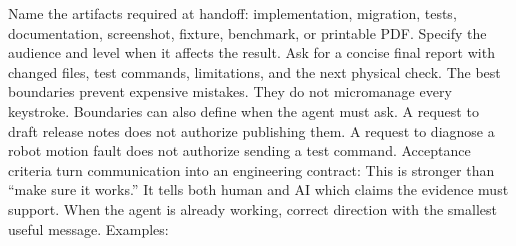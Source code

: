 {}
\markdownRendererSectionEnd \markdownRendererSectionBegin
{}\markdownRendererInterblockSeparator
{}Name the artifacts required at handoff: implementation, migration, tests,\markdownRendererSoftLineBreak
{}documentation, screenshot, fixture, benchmark, or printable PDF. Specify the\markdownRendererSoftLineBreak
{}audience and level when it affects the result. Ask for a concise final report\markdownRendererSoftLineBreak
{}with changed files, test commands, limitations, and the next physical check.\markdownRendererInterblockSeparator
{}
\markdownRendererSectionEnd \markdownRendererSectionBegin
{}\markdownRendererInterblockSeparator
{}The best boundaries prevent expensive mistakes. They do not micromanage every\markdownRendererSoftLineBreak
{}keystroke.\markdownRendererInterblockSeparator
{}\markdownRendererInterblockSeparator
{}Boundaries can also define when the agent must ask. A request to draft release\markdownRendererSoftLineBreak
{}notes does not authorize publishing them. A request to diagnose a robot motion\markdownRendererSoftLineBreak
{}fault does not authorize sending a test command.\markdownRendererInterblockSeparator
{}
\markdownRendererSectionEnd \markdownRendererSectionBegin
{}\markdownRendererInterblockSeparator
{}Acceptance criteria turn communication into an engineering contract:\markdownRendererInterblockSeparator
{}\markdownRendererInterblockSeparator
{}This is stronger than “make sure it works.” It tells both human and AI which\markdownRendererSoftLineBreak
{}claims the evidence must support.\markdownRendererInterblockSeparator
{}
\markdownRendererSectionEnd \markdownRendererSectionBegin
{}\markdownRendererInterblockSeparator
{}When the agent is already working, correct direction with the smallest useful\markdownRendererSoftLineBreak
{}message. Examples:\markdownRendererInterblockSeparator
{}\markdownRendererInterblockSeparator
